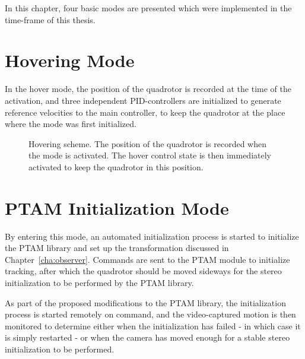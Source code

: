    In this chapter, four basic modes are presented which were implemented
    in the time-frame of this thesis.

\pagebreak
    \section{Hovering Mode}
        In the hover mode, the position of the quadrotor is recorded at
        the time of the activation, and three independent PID-controllers
        are initialized to generate reference velocities to the main controller,
        to keep the quadrotor at the place where the mode was first initialized.
        \begin{figure}[H]
            \noindent{}
            \caption{Hovering scheme. The position of the quadrotor is recorded when the mode is activated. The hover control state is then immediately activated to keep the quadrotor in this position.}
            \label{fig:logic:hoverscheme}
        \end{figure}
        
    \section{PTAM Initialization Mode}
        By entering this mode, an automated initialization process is started to
        initialize the PTAM library and set up the transformation discussed in Chapter~\ref{cha:observer}.
        Commands are sent to the PTAM module to initialize tracking, after which
        the quadrotor should be moved sideways for the stereo
        initialization to be performed by the PTAM library.

        As part of the proposed modifications to the PTAM library, the
        initialization process is started remotely on command,
        and the video-captured motion is then monitored to determine either
        when the initialization has failed - in which case it is simply restarted -
        or when the camera has moved enough for a stable stereo initialization to be performed.

